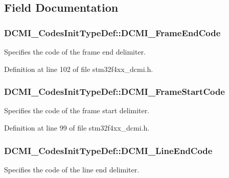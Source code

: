 \subsection{Field Documentation}
\hypertarget{struct_d_c_m_i___codes_init_type_def_a1feb31acae8822c64ed5541b6da8f7e1}{
\subsubsection[{D\-C\-M\-I\-\_\-\-Frame\-End\-Code}]{ D\-C\-M\-I\-\_\-\-Codes\-Init\-Type\-Def\-::\-D\-C\-M\-I\-\_\-\-Frame\-End\-Code}}\label{struct_d_c_m_i___codes_init_type_def_a1feb31acae8822c64ed5541b6da8f7e1}
Specifies the code of the frame end delimiter. 

Definition at line 102 of file stm32f4xx\-\_\-dcmi.\-h.

\hypertarget{struct_d_c_m_i___codes_init_type_def_a3b8da4e40e51dfd9641e8cb729fb1ffa}{
\subsubsection[{D\-C\-M\-I\-\_\-\-Frame\-Start\-Code}]{ D\-C\-M\-I\-\_\-\-Codes\-Init\-Type\-Def\-::\-D\-C\-M\-I\-\_\-\-Frame\-Start\-Code}}\label{struct_d_c_m_i___codes_init_type_def_a3b8da4e40e51dfd9641e8cb729fb1ffa}
Specifies the code of the frame start delimiter. 

Definition at line 99 of file stm32f4xx\-\_\-dcmi.\-h.

\hypertarget{struct_d_c_m_i___codes_init_type_def_a5d609eda1abbf53705d5d20a1bdabccc}{
\subsubsection[{D\-C\-M\-I\-\_\-\-Line\-End\-Code}]{ D\-C\-M\-I\-\_\-\-Codes\-Init\-Type\-Def\-::\-D\-C\-M\-I\-\_\-\-Line\-End\-Code}}\label{struct_d_c_m_i___codes_init_type_def_a5d609eda1abbf53705d5d20a1bdabccc}
Specifies the code of the line end delimiter. 

